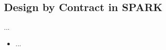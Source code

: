 \subsection{Design by Contract in SPARK}
\begin{frame}{\insertsubsection}
	\begin{fancycolumns}
		\begin{definition}{...}
			\begin{itemize}
				\item ...
			\end{itemize}
		\end{definition}
		\nextcolumn
	\end{fancycolumns}
\end{frame}



